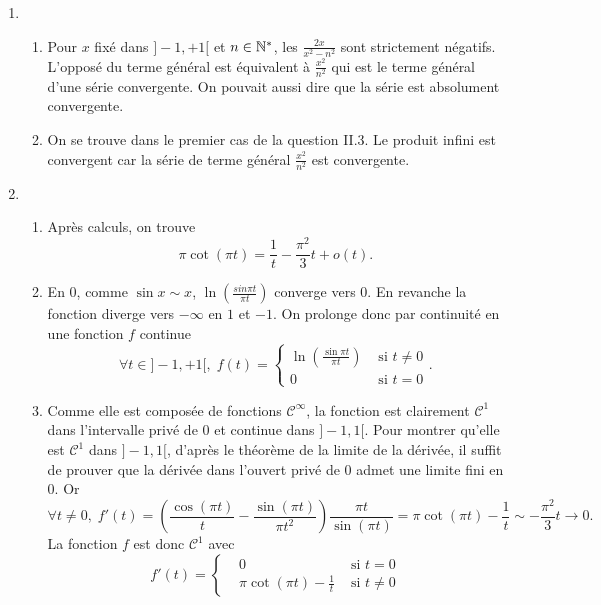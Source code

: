 \begin{enumerate}
 \item 
\begin{enumerate}
 \item Pour $x$ fixé dans $]-1,+1[$ et $n \in \mathbb{N}^*$, les $\frac{2x}{x^2 - n^2}$ sont strictement négatifs. L'opposé du terme général est équivalent à $\frac{x^2}{n^2}$ qui est le terme général d'une série convergente. On pouvait aussi dire que la série est absolument convergente. 
 \item On se trouve dans le premier cas de la question II.3. Le produit infini est convergent car la série de terme général $\frac{x^2}{n^2}$ est convergente.
\end{enumerate}

 \item
\begin{enumerate}
 \item Après calculs, on trouve
\[
 \pi \cot(\pi t) = \frac{1}{t} - \frac{\pi^2}{3}t + o(t).
\]

 \item En $0$, comme $\sin x \sim x$, $\ln(\frac{sin \pi t}{\pi t})$ converge vers $0$. En revanche la fonction diverge vers $-\infty$ en $1$ et $-1$. On prolonge donc par continuité en une fonction $f$ continue
\[
 \forall t \in ]-1,+1[, \;
 f(t) =
 \left\lbrace 
 \begin{aligned}
  \ln\left(\frac{\sin \pi t}{\pi t} \right) &\text{ si } t\neq 0 \\
  0  &\text{ si } t = 0
 \end{aligned}
\right. .
\]
 
 \item Comme elle est composée de fonctions $\mathcal{C}^{\infty}$, la fonction est clairement $\mathcal{C}^{1}$ dans l'intervalle privé de $0$ et continue dans $]-1,1[$. Pour montrer qu'elle est $\mathcal{C}^{1}$ dans $]-1,1[$, d'après le théorème de la limite de la dérivée, il suffit de prouver que la dérivée dans l'ouvert privé de $0$ admet une limite fini en $0$. Or
\[
 \forall t \neq 0, \; f'(t) = 
\left(\frac{\cos(\pi t)}{t} -\frac{\sin(\pi t)}{\pi t^2} \right)\frac{\pi t}{\sin (\pi t)}
= \pi \cot(\pi t) - \frac{1}{t}
\sim - \frac{\pi^2}{3}t \rightarrow 0.
\]
La fonction $f$ est donc $\mathcal{C}^1$ avec 
\[
 f'(t) = 
\left\lbrace 
\begin{aligned}
 &0 &\text{ si } t = 0 \\
 &\pi \cot(\pi t) - \frac{1}{t} &\text{ si } t \neq 0
\end{aligned}
\right. 
\]
\end{enumerate}


\end{enumerate}
